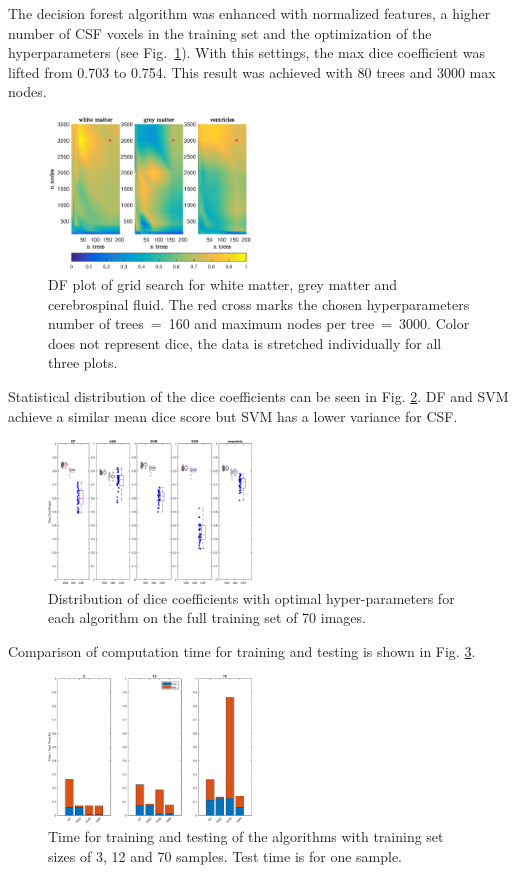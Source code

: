 \documentclass[journal]{IEEEtran}
\begin{document}
The decision forest algorithm was enhanced with normalized features, a higher number of CSF voxels in the training set and the optimization of the hyperparameters (see Fig.~\ref{f.df_white}). With this settings, the max dice coefficient was lifted from 0.703 to 0.754. This result was achieved with 80 trees and 3000 max nodes.

\begin{figure}[h!]\label{f.df_white}
	\centering
	\includegraphics[width=0.48\textwidth]{images/df_grid}
	\caption{DF plot of grid search for white matter, grey matter and cerebrospinal fluid. The red cross marks the chosen hyperparameters number of trees~=~160 and maximum nodes per tree~=~3000. Color does not represent dice, the data is stretched individually for all three plots.}
\end{figure}



Statistical distribution of the dice coefficients can be seen in Fig. \ref{f.boxplot}. DF and SVM achieve a similar mean dice score but SVM has a lower variance for CSF.
\begin{figure}\label{f.boxplot}
	\centering
	\includegraphics[width=0.48\textwidth]{images/boxplot}
	\caption{Distribution of dice coefficients with optimal hyper-parameters for each algorithm on the full training set of 70 images.}
\end{figure}

Comparison of computation time for training and testing is shown in Fig. \ref{f.runtimebarplot}.
\begin{figure}\label{f.runtimebarplot}
	\centering
	\includegraphics[width=0.48\textwidth]{images/runtimes}
	\caption{Time for training and testing of the algorithms with training set sizes of 3, 12 and 70 samples. Test time is for one sample.}
\end{figure}
\end{document}
